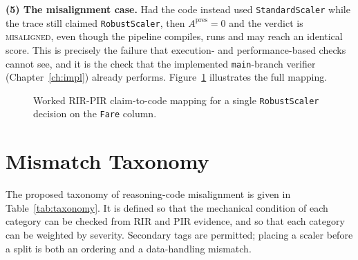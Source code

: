 \noindent\textbf{(5) The misalignment case.} Had the code instead
used \texttt{StandardScaler} while the trace still claimed
\texttt{RobustScaler}, then $A^{\mathrm{pres}}=0$ and the verdict is
\textsc{misaligned}, even though the pipeline compiles, runs and
may reach an identical score. This is precisely the failure that
execution- and performance-based checks cannot see, and it is the
check that the implemented \texttt{main}-branch verifier
(Chapter~\ref{ch:impl}) already performs. Figure~\ref{fig:rirpir}
illustrates the full mapping.

\begin{figure}[H]
    \centering
    \caption{Worked RIR-PIR claim-to-code mapping for a single
    \texttt{RobustScaler} decision on the \texttt{Fare} column.}
    \label{fig:rirpir}
\end{figure}

\section{Mismatch Taxonomy}

The proposed taxonomy of reasoning-code misalignment is given in
Table~\ref{tab:taxonomy}. It is defined so that the mechanical
condition of each category can be checked from RIR and PIR evidence,
and so that each category can be weighted by severity. Secondary
tags are permitted; placing a scaler before a split is both an
ordering and a data-handling mismatch.

